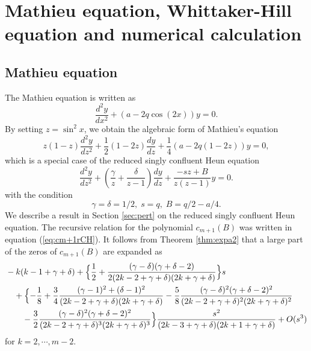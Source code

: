 \documentclass[12pt]{amsart}
\numberwithin{equation}{section}
\theoremstyle{definition}
\theoremstyle{remark}
\begin{document}
\section{Mathieu equation, Whittaker-Hill equation and numerical calculation} \label{sec:MWH}

\subsection{Mathieu equation} 
The Mathieu equation is written as
\begin{equation}
\frac{d^2y}{dx^2} + ( a -2q \cos (2x)) y=0.
\end{equation}
By setting $z = \sin ^2 x$, we obtain the algebraic form of Mathieu's equation
\begin{equation}
z(1-z)\frac{d^2y}{dz^2} + \frac{1}{2}(1-2z) \frac{dy}{dz} + \frac{1}{4}(a-2q(1-2z)) y=0 ,
\end{equation}
which is a special case of the reduced singly confluent Heun equation
\begin{equation}
\frac{d^2y}{dz^2} + \left( \frac{\gamma}{z}+\frac{\delta }{z-1} \right) \frac{dy}{dz} +\frac{-s z + B }{z(z-1)} y=0 .
\end{equation}
with the condition
\begin{equation}
\gamma = \delta =1/2, \; s=q , \; B = q/2-a/4 .
\end{equation}
We describe a result in Section \ref{sec:pert} on the reduced singly confluent Heun equation.
The recursive relation for the polynomial $c_{m+1} (B)$ was written in equation (\ref{eq:cm+1rCH}).
It follows from Theorem \ref{thm:expa2} that a large part of the zeros of $c_{m+1} (B) $ are expanded as
\begin{align}
&  -k(k-1+\gamma +\delta ) + \Bigl\{ \frac{1}{2} +\frac{(\gamma -\delta )(\gamma +\delta -2 ) }{2 (2 k-2+\gamma +\delta ) (2 k+\gamma +\delta ) } \Bigr\} s \label{eq:BkRCHE} \\
& \quad + \Bigl\{ - \frac{1}{8} +\frac{3}{4} \frac{ (\gamma -1 )^2 +(\delta  -1 )^2 }{ (2 k-2+\gamma +\delta ) (2 k+\gamma +\delta )} -\frac{5}{8} \frac{(\gamma -\delta )^2 (\gamma +\delta -2 ) ^2}{ (2 k-2+\gamma +\delta )^2 (2 k+\gamma +\delta )^2} \nonumber \\
& \qquad -\frac{3}{2} \frac{(\gamma -\delta )^2 (\gamma +\delta -2 )^2}{ (2 k-2+\gamma +\delta )^3 (2 k+\gamma +\delta )^3}  \Bigr\} \frac{s^2 }{(2 k-3+\gamma +\delta ) (2 k+1 +\gamma +\delta )  } + O(s^3)  \nonumber 
\end{align}
for $k= 2,\cdots, m-2  $.
\end{document}
